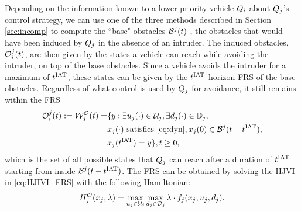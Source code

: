 Depending on the information known to a lower-priority vehicle $Q_i$ about $Q_j$'s control strategy, we can use one of the three methods described in Section \ref{sec:incomp} to compute the ``base" obstacles $\mathcal{B}^j(t)$ , the obstacles that would have been induced by $Q_j$ in the absence of an intruder. The induced obstacles, $\mathcal{O}_i^j(t)$, are then given by the states a vehicle can reach while avoiding the intruder, on top of the base obstacles. Since a vehicle avoids the intruder for a maximum of $t^\text{IAT}$, these states can be given by the $t^\text{IAT}$-horizon FRS of the base obstacles. Regardless of what control is used by $Q_j$ for avoidance, it still remains within the FRS 
\begin{equation} \label{eq:intObs}
\begin{aligned}
\ioset_i^j(t) := \frs_{j}^{\mathcal{O}}(t) = & \{y: \exists \ctrl_j(\cdot) \in \cset_j, \exists \dstb_j(\cdot) \in \dfset_j, \\
& \state_j(\cdot) \text{ satisfies \eqref{eq:dyn}}, \state_j(0) \in \boset^j(t-\iat), \\
& \state_j(\iat) = y\}, t \geq 0, 
\end{aligned}
\end{equation}
which is the set of all possible states that $Q_j$ can reach after a duration of $t^\text{IAT}$ starting from inside $\mathcal{B}^j(t-t^\text{IAT})$. The FRS can be obtained by solving the HJVI in \eqref{eq:HJIVI_FRS} with the following Hamiltonian:
\begin{equation}
\ham_{j}^{\mathcal{O}}(\state_j, \costate) = \max_{\ctrl_j \in \cset_j} \max_{\dstb_j \in \dset_j} \costate \cdot f_j (\state_j, \ctrl_j, \dstb_j) \label{intobs2}.
\end{equation} 
%
%

